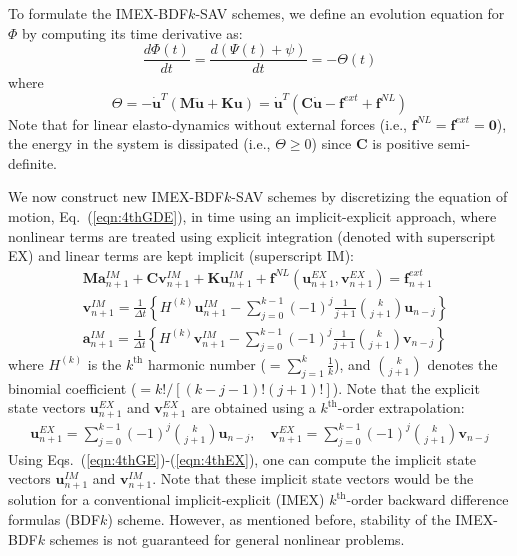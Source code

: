 \documentclass[review]{elsarticle}
\begin{document}
To formulate the IMEX-BDF$k$-SAV schemes, we define an evolution equation for $\Phi$ by computing its time derivative as:
\begin{equation}
    \frac{d\Phi(t)}{dt} = \frac{d(\Psi(t)+\psi)}{dt} = -\Theta(t)
    \label{eqn:4thSAV_ODE}
\end{equation}
where 
\begin{equation}
    \Theta=-\dot{\boldsymbol{u}}^T \left( \boldsymbol{M}\ddot{\boldsymbol{u}} + \boldsymbol{K}\boldsymbol{u} \right)=\dot{\boldsymbol{u}}^T \left( \boldsymbol{C}\dot{\boldsymbol{u}}-\boldsymbol{f}^{ext}+\boldsymbol{f}^{NL} \right)
    \label{eqn:4thSAV_theta}
\end{equation}
Note that for linear elasto-dynamics without external forces (i.e., $\boldsymbol{f}^{NL}=\boldsymbol{f}^{ext}=\boldsymbol{0}$), the energy in the system is dissipated (i.e., $\Theta \ge 0$) since $\boldsymbol{C}$ is positive semi-definite.

We now construct new IMEX-BDF$k$-SAV schemes by discretizing the equation of motion, Eq.~(\ref{eqn:4thGDE}), in time using an implicit-explicit approach, where nonlinear terms are treated using explicit integration (denoted with superscript EX) and linear terms are kept implicit (superscript IM):
\begin{align}
    &\boldsymbol{M}\boldsymbol{a}_{n+1}^{IM} + \boldsymbol{C}\boldsymbol{v}_{n+1}^{IM} + \boldsymbol{K}\boldsymbol{u}_{n+1}^{IM} +\boldsymbol{f}^{NL}\left(\boldsymbol{u}_{n+1}^{EX} ,\boldsymbol{v}_{n+1}^{EX} \right)=\boldsymbol{f}^{ext}_{n+1} \label{eqn:4thGE} \\
    &\boldsymbol{v}_{n+1}^{IM} = \frac{1}{\Delta t} \left\{ H^{(k)}\boldsymbol{u}_{n+1}^{IM} - \sum_{j=0}^{k-1}(-1)^j\frac{1}{j+1}{k \choose j+1} \boldsymbol{u}_{n-j} \right\} \label{eqn:4thBDFvel} \\
    &\boldsymbol{a}_{n+1}^{IM} = \frac{1}{\Delta t} \left\{ H^{(k)}\boldsymbol{v}_{n+1}^{IM} - \sum_{j=0}^{k-1}(-1)^j\frac{1}{j+1}{k \choose j+1} \boldsymbol{v}_{n-j} \right\} \label{eqn:4thBDFacc}
\end{align}
where $H^{(k)}$ is the $k^{\textrm{th}}$ harmonic number ($=\sum_{j=1}^k\frac{1}{k}$), and ${k \choose j+1}$ denotes the binomial coefficient ($=k! /[(k-j-1)!(j+1)!]$).
Note that the explicit state vectors $\boldsymbol{u}_{n+1}^{EX}$ and $\boldsymbol{v}_{n+1}^{EX}$ are obtained using a $k^{\textrm{th}}$-order extrapolation:
\begin{align}
    \boldsymbol{u}_{n+1}^{EX} = \sum_{j=0}^{k-1} (-1)^{j} {k \choose j+1}\boldsymbol{u}_{n-j}, \quad
    \boldsymbol{v}_{n+1}^{EX} = \sum_{j=0}^{k-1} (-1)^{j} {k \choose j+1}\boldsymbol{v}_{n-j}
    \label{eqn:4thEX}
\end{align}
Using Eqs.~(\ref{eqn:4thGE})-(\ref{eqn:4thEX}), one can compute the implicit state vectors $\boldsymbol{u}_{n+1}^{IM}$ and $\boldsymbol{v}_{n+1}^{IM}$.
Note that these implicit state vectors would be the solution for a conventional implicit-explicit (IMEX) $k^\textrm{th}$-order backward difference formulas (BDF$k$) scheme.
However, as mentioned before, stability of the IMEX-BDF$k$ schemes is not guaranteed for general nonlinear problems. 
\end{document}
